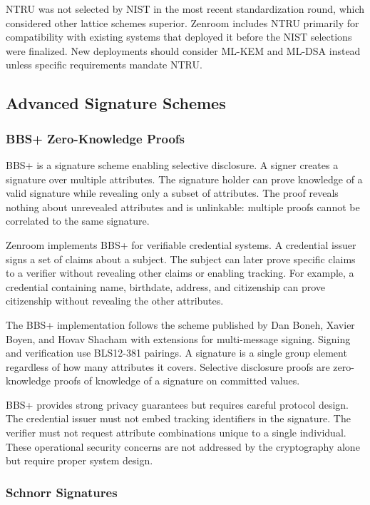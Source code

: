 NTRU was not selected by NIST in the most recent standardization
round, which considered other lattice schemes superior. Zenroom
includes NTRU primarily for compatibility with existing systems that
deployed it before the NIST selections were finalized. New deployments
should consider ML-KEM and ML-DSA instead unless specific requirements
mandate NTRU.

\subsection{Advanced Signature Schemes}

\subsubsection{BBS+ Zero-Knowledge Proofs}

BBS+ is a signature scheme enabling selective disclosure. A signer
creates a signature over multiple attributes. The signature holder can
prove knowledge of a valid signature while revealing only a subset of
attributes. The proof reveals nothing about unrevealed attributes and
is unlinkable: multiple proofs cannot be correlated to the same
signature.

Zenroom implements BBS+ for verifiable credential systems. A
credential issuer signs a set of claims about a subject. The subject
can later prove specific claims to a verifier without revealing other
claims or enabling tracking. For example, a credential containing
name, birthdate, address, and citizenship can prove citizenship
without revealing the other attributes.

The BBS+ implementation follows the scheme published by Dan Boneh,
Xavier Boyen, and Hovav Shacham with extensions for multi-message
signing. Signing and verification use BLS12-381 pairings. A signature
is a single group element regardless of how many attributes it
covers. Selective disclosure proofs are zero-knowledge proofs of
knowledge of a signature on committed values.

BBS+ provides strong privacy guarantees but requires careful protocol
design. The credential issuer must not embed tracking identifiers in
the signature. The verifier must not request attribute combinations
unique to a single individual. These operational security concerns are
not addressed by the cryptography alone but require proper system
design.

\subsubsection{Schnorr Signatures}

